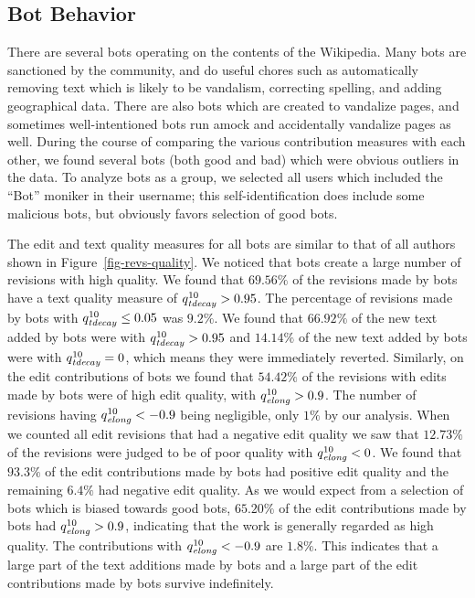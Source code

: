 \subsection{Bot Behavior}

There are several bots operating on the contents of the Wikipedia.
Many bots are sanctioned by the community, and do useful
chores such as automatically removing text which is likely
to be vandalism, correcting spelling, and adding geographical data.
There are also bots which are created to vandalize pages,
and sometimes well-intentioned bots run amock and
accidentally vandalize pages as well.
During the course of comparing the various contribution
measures with each other, we found several bots (both
good and bad) which were obvious outliers in the data.
To analyze bots as a group, we selected all users
which included the ``Bot'' moniker in their username;
this self-identification does include some malicious bots,
but obviously favors selection of good bots.

The edit and text quality measures for all bots are similar to
that of all authors shown in Figure~\ref{fig-revs-quality}.
We noticed that bots create a large number of revisions with
high quality.
We found that $69.56\%$ of the revisions made by
bots have a text quality measure of $\quality{tdecay}{10}{} > 0.95$.
The percentage of revisions made by bots with
$\quality{tdecay}{10}{} \le 0.05$ was $9.2\%$.
We found that $66.92\%$ of the new text added by bots were with
$\quality{tdecay}{10}{} > 0.95$ and $14.14\%$ of the new text added by
bots were with $\quality{tdecay}{10}{} = 0$, which means they were
immediately reverted.
Similarly, on the edit contributions of bots we found that
$54.42\%$ of the revisions with edits made by bots were of
high edit quality, with $\quality{elong}{10}{} > 0.9$.
The number of revisions having $\quality{elong}{10}{} < -0.9$ being
negligible, only $1\%$ by our analysis.
When we counted all edit revisions that had a negative edit
quality we saw that $12.73\%$ of the revisions were judged to
be of poor quality with $\quality{elong}{10}{} < 0$.
We found that $93.3\%$ of the edit contributions made by bots
had positive edit quality and the remaining $6.4\%$ had
negative edit quality.
As we would expect from a selection of bots which is biased
towards good bots, $65.20\%$ of the edit contributions made
by bots had $\quality{elong}{10}{} > 0.9$, indicating that
the work is generally regarded as high quality.
The contributions with $\quality{elong}{10}{} < -0.9$ are $1.8\%$.
This indicates that a large part of the text additions made by bots
and a large part of the edit contributions made by bots survive
indefinitely.

